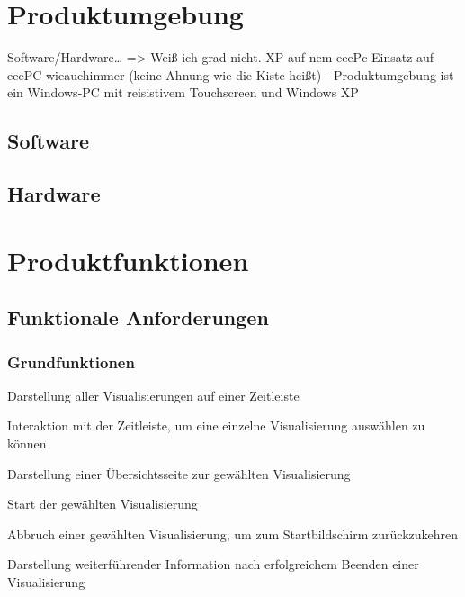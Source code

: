 \documentclass{article}
\begin{document}
\section{Produktumgebung}

Software/Hardware… => Weiß ich grad nicht. XP auf nem eeePc
Einsatz auf eeePC wieauchimmer (keine Ahnung wie die Kiste heißt)
- Produktumgebung ist ein Windows-PC mit reisistivem Touchscreen 
und Windows XP

\subsection{Software}

\subsection{Hardware}

\section{Produktfunktionen}

\subsection{Funktionale Anforderungen}

\subsubsection{Grundfunktionen}

\begin{FA}[start=100]
\item Darstellung aller Visualisierungen auf einer Zeitleiste
\item Interaktion mit der Zeitleiste, um eine einzelne Visualisierung auswählen zu können
\item Darstellung einer Übersichtsseite zur gewählten Visualisierung
\item Start der gewählten Visualisierung
\item Abbruch einer gewählten Visualisierung, um zum Startbildschirm zurückzukehren
\item Darstellung weiterführender Information nach erfolgreichem Beenden einer Visualisierung
\end{FA}

\end{document}
